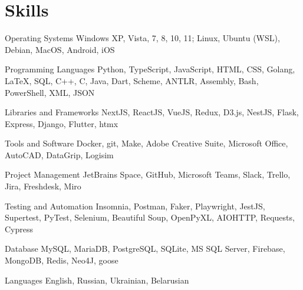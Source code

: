 \section{Skills}

\cvitem
    {Operating Systems}
    {%
        Windows XP, Vista, 7, 8, 10, 11; Linux, Ubuntu (WSL), Debian,
        MacOS, Android, iOS%
    }

\cvitem
    {Programming Languages}
    {%
        Python, TypeScript, JavaScript, HTML, CSS, Golang, \LaTeX, SQL, C++, C,
        Java, Dart, Scheme, ANTLR, Assembly, Bash, PowerShell, XML, JSON%
    }

\cvitem
    {Libraries and Frameworks}
    {%
        NextJS, ReactJS, VueJS, Redux, D3.js, NestJS, Flask, Express, Django,
        Flutter, htmx%
    }

\cvitem
    {Tools and Software}
    {%
        Docker, git, Make, Adobe Creative Suite, Microsoft Office, AutoCAD,
        DataGrip, Logisim%
    }

\cvitem
    {Project Management}
    {%
        JetBrains Space, GitHub, Microsoft Teams, Slack, Trello, Jira,
        Freshdesk, Miro%
    }

\cvitem
    {Testing and Automation}
    {%
        Insomnia, Postman, Faker, Playwright, JestJS, Supertest, PyTest,
        Selenium, Beautiful Soup, OpenPyXL, AIOHTTP, Requests, Cypress%
    }

\cvitem
    {Database}
    {%
        MySQL, MariaDB, PostgreSQL, SQLite, MS SQL Server, Firebase, MongoDB,
        Redis, Neo4J, goose%
    }

\cvitem
    {Languages}
    {English, Russian, Ukrainian, Belarusian}
